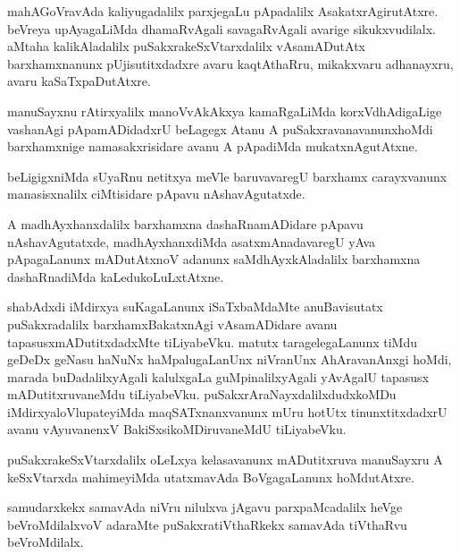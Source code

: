 \documentclass{article}
\begin{document}
\begin{mn}
mahAGoVravAda kaliyugadalilx parxjegaLu pApadalilx
AsakatxrAgirutAtxre. beVreya upAyagaLiMda dhamaRvAgali savagaRvAgali
avarige sikukxvudilalx. aMtaha kalikAladalilx puSakxrakeSxVtarxdalilx
vAsamADutAtx barxhamxnanunx pUjisutitxdadxre avaru kaqtAthaRru,
mikakxvaru adhanayxru, avaru kaSaTxpaDutAtxre.
\end{mn}

\begin{mn}
manuSayxnu rAtirxyalilx manoVvAkAkxya kamaRgaLiMda korxVdhAdigaLige
vashanAgi pApamADidadxrU beLagegx Atanu A puSakxravanavanunxhoMdi
barxhamxnige namasakxrisidare  avanu A pApadiMda mukatxnAgutAtxne.
\end{mn}

\begin{mn}%
beLigigxniMda sUyaRnu netitxya meVle baruvavaregU barxhamx
carayxvanunx manasisxnalilx ciMtisidare pApavu nAshavAgutatxde.
\end{mn}

\begin{mn}
A madhAyxhanxdalilx barxhamxna dashaRnamADidare pApavu
nAshavAgutatxde, madhAyxhanxdiMda asatxmAnadavaregU yAva pApagaLanunx
mADutAtxnoV adanunx saMdhAyxkAladalilx barxhamxna dashaRnadiMda kaLedukoLuLxtAtxne.
\end{mn}

\begin{mn}%
shabAdxdi iMdirxya suKagaLanunx iSaTxbaMdaMte anuBavisutatx 
puSakxradalilx barxhamxBakatxnAgi vAsamADidare avanu
tapasusxmADutitxdadxMte tiLiyabeVku. matutx taragelegaLanunx tiMdu
geDeDx geNasu haNuNx haMpalugaLanUnx niVranUnx AhAravanAnxgi hoMdi,
marada buDadalilxyAgali kalulxgaLa guMpinalilxyAgali yAvAgalU tapasusx
mADutitxruvaneMdu tiLiyabeVku. puSakxrAraNayxdalilxdudxkoMDu
iMdirxyaloVlupateyiMda maqSATxnanxvanunx mUru hotUtx tinunxtitxdadxrU
avanu vAyuvanenxV BakiSxsikoMDiruvaneMdU tiLiyabeVku.
\end{mn}

\begin{mn}%
puSakxrakeSxVtarxdalilx oLeLxya kelasavanunx mADutitxruva manuSayxru A
keSxVtarxda mahimeyiMda utatxmavAda BoVgagaLanunx hoMdutAtxre.
\end{mn}

\begin{mn}
samudarxkekx samavAda niVru nilulxva jAgavu parxpaMcadalilx heVge
beVroMdilalxvoV adaraMte puSakxratiVthaRkekx samavAda tiVthaRvu beVroMdilalx.
\end{mn}
\end{document}
